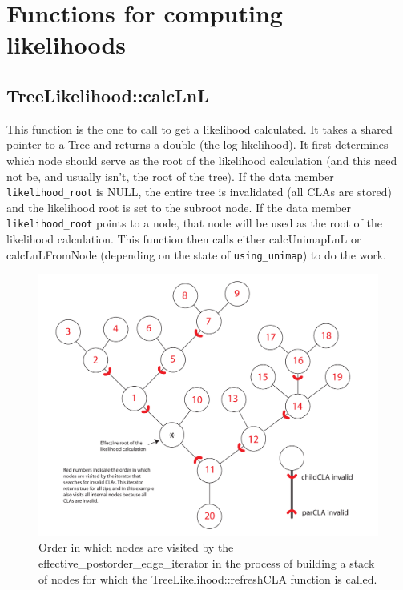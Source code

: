 \section{Functions for computing likelihoods}

\subsection{TreeLikelihood::calcLnL}
This function is the one to call to get a likelihood calculated. It takes a shared pointer to a Tree and returns a double (the log-likelihood). It first determines which node should serve as the root of the likelihood calculation (and this need not be, and usually isn't, the root of the tree). If the data member {\tt likelihood\_root} is NULL, the entire tree is invalidated (all CLAs are stored) and the likelihood root is set to the subroot node. If the data member {\tt likelihood\_root} points to a node, that node will be used as the root of the likelihood calculation. This function then calls either calcUnimapLnL or calcLnLFromNode (depending on the state of {\tt using\_unimap}) to do the work.

%
%
\begin{figure}[t]
\begin{center}
\hfil\includegraphics[scale=0.6]{ConditionalLikelihoodArrays/EffectiveRoot.pdf}\hfil
\caption{Order in which nodes are visited by the effective\_postorder\_edge\_iterator in the process of building a stack of nodes for which the TreeLikelihood::refreshCLA function is called.}
\label{edgeiterator}
\end{center}
\end{figure}


